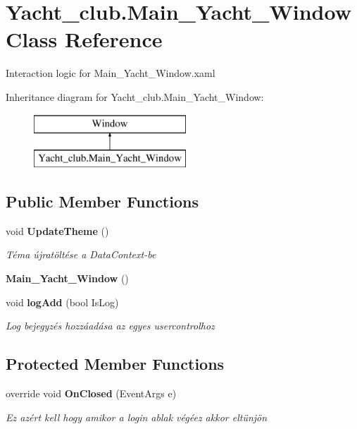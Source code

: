 \section{Yacht\+\_\+club.\+Main\+\_\+\+Yacht\+\_\+\+Window Class Reference}
\label{class_yacht__club_1_1_main___yacht___window}


Interaction logic for Main\+\_\+\+Yacht\+\_\+\+Window.\+xaml  


Inheritance diagram for Yacht\+\_\+club.\+Main\+\_\+\+Yacht\+\_\+\+Window\+:\begin{figure}[H]
\begin{center}
\leavevmode
\includegraphics[height=2.000000cm]{class_yacht__club_1_1_main___yacht___window}
\end{center}
\end{figure}
\subsection*{Public Member Functions}
\begin{DoxyCompactItemize}
\item 
void \textbf{ Update\+Theme} ()
\begin{DoxyCompactList}\small\item\em Téma újratöltése a Data\+Context-\/be \end{DoxyCompactList}\item 
\textbf{ Main\+\_\+\+Yacht\+\_\+\+Window} ()
\item 
void \textbf{ log\+Add} (bool Is\+Log)
\begin{DoxyCompactList}\small\item\em Log bejegyzés hozzáadása az egyes usercontrolhoz \end{DoxyCompactList}\end{DoxyCompactItemize}
\subsection*{Protected Member Functions}
\begin{DoxyCompactItemize}
\item 
override void \textbf{ On\+Closed} (Event\+Args e)
\begin{DoxyCompactList}\small\item\em Ez azért kell hogy amikor a login ablak végéez akkor eltünjön \end{DoxyCompactList}\end{DoxyCompactItemize}


